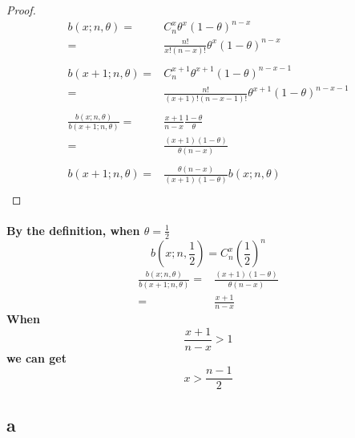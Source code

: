 \documentclass{article}
\begin{document}
    \section{}
        \begin{proof}
            \begin{equation*}
                \begin{split}
                    b(x;n,\theta)=&C_n^x\theta^x(1-\theta)^{n-x}\\
                        =&\frac{n!}{x!(n-x)!}\theta^x(1-\theta)^{n-x}\\
                        \\
                    b(x+1;n,\theta)=&C_n^{x+1}\theta^{x+1}(1-\theta)^{n-x-1}\\
                        =&\frac{n!}{(x+1)!(n-x-1)!}\theta^{x+1}(1-\theta)^{n-x-1}\\
                        \\
                    \frac{b(x;n,\theta)}{b(x+1;n,\theta)}=& \frac{x+1}{n-x}\frac{1-\theta}{\theta}\\
                        =&\frac{(x+1)(1-\theta)}{\theta(n-x)}\\
                        \\
                    b(x+1;n,\theta)=&\frac{\theta(n-x)}{(x+1)(1-\theta)}b(x;n,\theta)\\
                \end{split}
            \end{equation*}
        \end{proof}         
        \paragraph{
            By the definition, when $\theta=\frac{1}{2}$
            $$b(x;n,\frac{1}{2})=C_n^x(\frac{1}{2})^n$$
            \begin{equation*}
                \begin{split}
                    \frac{b(x;n,\theta)}{b(x+1;n,\theta)}=&\frac{(x+1)(1-\theta)}{\theta(n-x)}\\
                        =&\frac{x+1}{n-x}
                \end{split}
            \end{equation*}
            When 
            $$\frac{x+1}{n-x}>1$$
            we can get 
            $$x>\frac{n-1}{2}$$
        }
        \subsection*{a}
\end{document}
